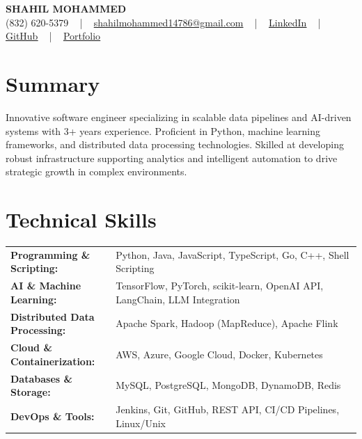 \documentclass[letterpaper,11pt]{article}
\begin{document}
\begin{center}
    {\fontsize{14pt}{12pt}\selectfont \textbf{\MakeUppercase{Shahil Mohammed}}}\\ \vspace{2pt}
    \fontsize{10pt}{12pt}\selectfont (832) 620-5379 ~ | ~ \href{mailto:shahilmohammed14786@gmail.com}{shahilmohammed14786@gmail.com} ~ | ~  
    \href{https://www.linkedin.com/in/shahil-mohammed-9652931a1/}{\color{blue}\underline{LinkedIn}}  ~ | ~ 
    \href{https://github.com/freakbeast14}{\color{blue}\underline{GitHub}} ~ | ~ 
    \href{https://shahil-mohammed.netlify.app/}{\color{blue}\underline{Portfolio}}
    \vspace{-8pt}
\end{center}

\section{Summary}
\fontsize{9pt}{10pt}\selectfont
Innovative software engineer specializing in scalable data pipelines and AI-driven systems with 3+ years experience. Proficient in Python, machine learning frameworks, and distributed data processing technologies. Skilled at developing robust infrastructure supporting analytics and intelligent automation to drive strategic growth in complex environments.
 \vspace{-5pt}
 
\section{Technical Skills}
        \vspace{-14pt}
        \begin{table}[h]
            \fontsize{9pt}{10pt}\selectfont
            \begin{tabular}{p{0.3\linewidth} p{0.7\linewidth}}
                \textbf{Programming \& Scripting:} & Python, Java, JavaScript, TypeScript, Go, C++, Shell Scripting \\
                \textbf{AI \& Machine Learning:} & TensorFlow, PyTorch, scikit-learn, OpenAI API, LangChain, LLM Integration \\
                \textbf{Distributed Data Processing:} & Apache Spark, Hadoop (MapReduce), Apache Flink \\
                \textbf{Cloud \& Containerization:} & AWS, Azure, Google Cloud, Docker, Kubernetes \\
                \textbf{Databases \& Storage:} & MySQL, PostgreSQL, MongoDB, DynamoDB, Redis \\
                \textbf{DevOps \& Tools:} & Jenkins, Git, GitHub, REST API, CI/CD Pipelines, Linux/Unix \\
            \end{tabular}
        \end{table}
 \vspace{-15pt}
 
\end{document}
